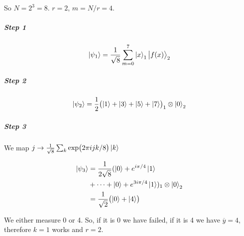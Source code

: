 So \( N = 2^3 = 8 \). \( r=2 \), \( m = N/r = 4 \).

\subparagraph{Step 1}

\begin{equation}
  \ket{\psi _1 }  =  \frac{1}{\sqrt{8}} \sum_{m=0} ^{7} \ket{x}_1 \ket{f(x)}_2
\end{equation}

\subparagraph{Step 2}

\begin{equation}
  \ket{\psi_2} = \frac{1}{2} \qty(\ket{1}+\ket{3}+\ket{5}+\ket{7})_1 \otimes \ket{0}_2
\end{equation}

\subparagraph{Step 3}

We map \( j \rightarrow \frac{1}{\sqrt{8}} \sum_k \exp(2 \pi i j k / 8) \ket{k} \)

\begin{align}
  \ket{\psi_3}
  &= \frac{1}{2 \sqrt{8}} (\ket{0} + e^{i \pi/4} \ket{1} \\
  &+ \dots + \ket{0} + e^{3 i \pi /4}\ket{1})_1 \otimes \ket{0}_2 \\
  &= \frac{1}{\sqrt{2}} \qty(\ket{0}+\ket{4} )
\end{align}

We either measure 0 or 4. So, if it is 0 we have failed, if it is 4 we have \( \overline{y} = 4 \), therefore \( k=1 \)  works and \( r=2 \).
